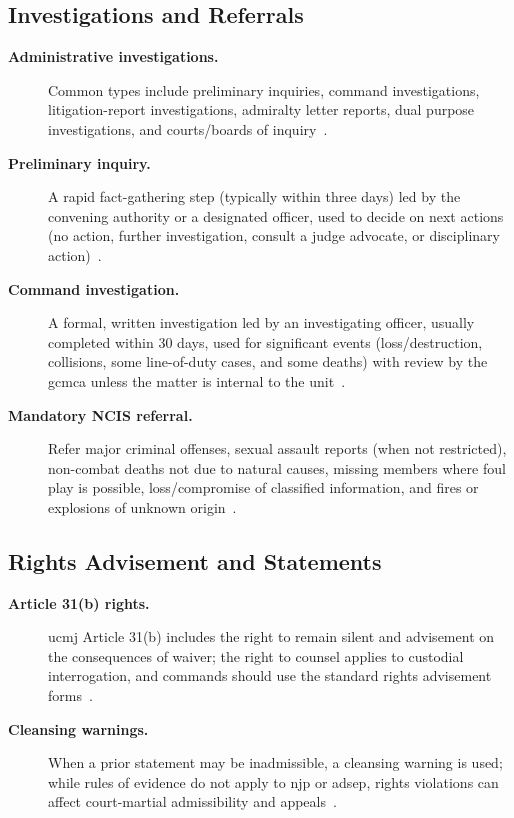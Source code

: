 \documentclass[../main.tex]{subfiles}
\begin{document}
\subsection{Investigations and Referrals}
\begin{description}
  \item[\textbf{Administrative investigations.}] Common types include preliminary inquiries, command investigations, litigation-report investigations, admiralty letter reports, dual purpose investigations, and courts/boards of inquiry~\autocite{edo-5-1-1-naval-justice-standards-2025}.
  \item[\textbf{Preliminary inquiry.}] A rapid fact-gathering step (typically within three days) led by the convening authority or a designated officer, used to decide on next actions (no action, further investigation, consult a judge advocate, or disciplinary action)~\autocite{edo-5-1-1-naval-justice-standards-2025}.
  \item[\textbf{Command investigation.}] A formal, written investigation led by an investigating officer, usually completed within 30 days, used for significant events (loss/destruction, collisions, some line-of-duty cases, and some deaths) with review by the \ac{gcmca} unless the matter is internal to the unit~\autocite{edo-5-1-1-naval-justice-standards-2025}.
  \item[\textbf{Mandatory NCIS referral.}] Refer major criminal offenses, sexual assault reports (when not restricted), non-combat deaths not due to natural causes, missing members where foul play is possible, loss/compromise of classified information, and fires or explosions of unknown origin~\autocite{edo-5-1-1-naval-justice-standards-2025}.
\end{description}

\subsection{Rights Advisement and Statements}
\begin{description}
  \item[\textbf{Article 31(b) rights.}] \ac{ucmj} Article 31(b) includes the right to remain silent and advisement on the consequences of waiver; the right to counsel applies to custodial interrogation, and commands should use the standard rights advisement forms~\autocite{edo-5-1-1-naval-justice-standards-2025}.
  \item[\textbf{Cleansing warnings.}] When a prior statement may be inadmissible, a cleansing warning is used; while rules of evidence do not apply to \ac{njp} or \ac{adsep}, rights violations can affect court-martial admissibility and appeals~\autocite{edo-5-1-1-naval-justice-standards-2025}.
\end{description}
\end{document}

